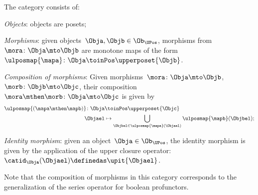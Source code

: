 \begin{definition}
\label{def:upos_cat}
The category \UPos consists of:
\begin{compactenum}
    \item \emph{Objects}: objects are posets;
    \item \emph{Morphisms}: given objects~$\Obja,\Objb\in \Ob_{\UPos}$, morphisms from~$\mora\colon \Obja \mto \Objb$ are monotone maps of the form~$\ulposmap{\mapa} \colon \Obja \toinPos \upperposet{\Objb}$.
    \item \emph{Composition of morphisms}: Given morphisms~$\mora\colon \Obja \mto \Objb$,~$\morb\colon \Objb\mto \Objc$, their composition~$\mora\mthen \morb\colon \Obja\mto \Objc$ is given by
    \begin{equation}
    \begin{aligned}
        \ulposmap{(\mapa \mthen \mapb)} \colon \Obja&\toinPos \upperposet{\Objc}\\
        \Objael&\mapsto \bigcup_{\Objbel\in \ulposmap{\mapa}(\Objael)}\ulposmap{\mapb}(\Objbel);
    \end{aligned}
    \end{equation}
    \item \emph{Identity morphism}: given an object~$\Obja\in \Ob_{\UPos}$, the identity morphism is given by the application of the upper closure operator:~$\catid_\Obja(\Objael)\definedas \upit\{\Objael\}$.
\end{compactenum}
\end{definition}

\begin{remark}
Note that the composition of morphisms in this category corresponds to the generalization of the series operator for boolean profunctors.
\end{remark}


